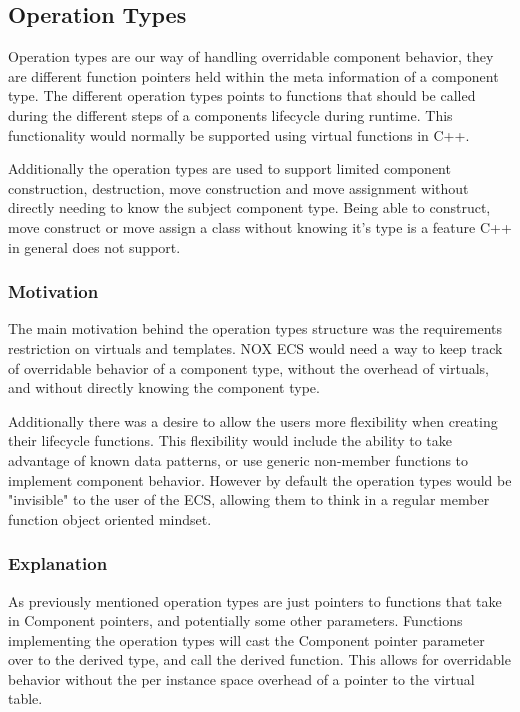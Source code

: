 \subsection{Operation Types}
\label{subsec:detailed_operation_types}
Operation types are our way of handling overridable component behavior,
they are different function pointers held within the meta information of a component type.
The different operation types points to functions that should be called during the different steps
of a components lifecycle during runtime.
This functionality would normally be supported using virtual functions in C++.

Additionally the operation types are used to support limited component construction, destruction,
move construction and move assignment without directly needing to know the subject component type.
Being able to construct, move construct or move assign a class without knowing it's type is a feature
C++ in general does not support. 

\subsubsection{Motivation}
The main motivation behind the operation types structure was the requirements restriction on virtuals
and templates.
NOX ECS would need a way to keep track of overridable behavior of a component type, without the overhead of virtuals,
and without directly knowing the component type.

Additionally there was a desire to allow the users more flexibility when creating their lifecycle functions.
This flexibility would include the ability to take advantage of known data patterns,
or use generic non-member functions to implement component behavior.
However by default the operation types would be "invisible" to the user of the ECS,
allowing them to think in a regular member function object oriented mindset.

\subsubsection{Explanation}
As previously mentioned operation types are just pointers to functions that take in Component pointers,
and potentially some other parameters.
Functions implementing the operation types will cast the Component pointer parameter over to the derived type,
and call the derived function.
This allows for overridable behavior without the per instance space overhead of a pointer to the virtual table.

